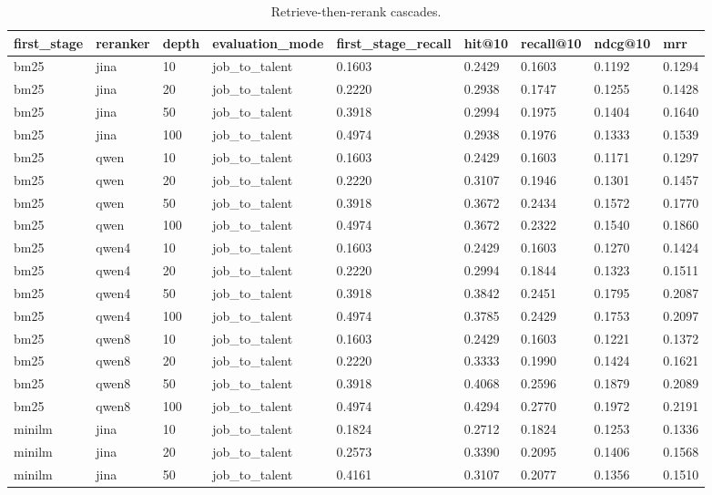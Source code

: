 \begin{table}[t]
\centering
\caption{Retrieve-then-rerank cascades.}
\label{tab:cascade}
\begin{tabular}{lllllllll}
\toprule
first_stage & reranker & depth & evaluation_mode & first_stage_recall & hit@10 & recall@10 & ndcg@10 & mrr \\
\midrule
bm25 & jina & 10 & job_to_talent & 0.1603 & 0.2429 & 0.1603 & 0.1192 & 0.1294 \\
bm25 & jina & 20 & job_to_talent & 0.2220 & 0.2938 & 0.1747 & 0.1255 & 0.1428 \\
bm25 & jina & 50 & job_to_talent & 0.3918 & 0.2994 & 0.1975 & 0.1404 & 0.1640 \\
bm25 & jina & 100 & job_to_talent & 0.4974 & 0.2938 & 0.1976 & 0.1333 & 0.1539 \\
bm25 & qwen & 10 & job_to_talent & 0.1603 & 0.2429 & 0.1603 & 0.1171 & 0.1297 \\
bm25 & qwen & 20 & job_to_talent & 0.2220 & 0.3107 & 0.1946 & 0.1301 & 0.1457 \\
bm25 & qwen & 50 & job_to_talent & 0.3918 & 0.3672 & 0.2434 & 0.1572 & 0.1770 \\
bm25 & qwen & 100 & job_to_talent & 0.4974 & 0.3672 & 0.2322 & 0.1540 & 0.1860 \\
bm25 & qwen4 & 10 & job_to_talent & 0.1603 & 0.2429 & 0.1603 & 0.1270 & 0.1424 \\
bm25 & qwen4 & 20 & job_to_talent & 0.2220 & 0.2994 & 0.1844 & 0.1323 & 0.1511 \\
bm25 & qwen4 & 50 & job_to_talent & 0.3918 & 0.3842 & 0.2451 & 0.1795 & 0.2087 \\
bm25 & qwen4 & 100 & job_to_talent & 0.4974 & 0.3785 & 0.2429 & 0.1753 & 0.2097 \\
bm25 & qwen8 & 10 & job_to_talent & 0.1603 & 0.2429 & 0.1603 & 0.1221 & 0.1372 \\
bm25 & qwen8 & 20 & job_to_talent & 0.2220 & 0.3333 & 0.1990 & 0.1424 & 0.1621 \\
bm25 & qwen8 & 50 & job_to_talent & 0.3918 & 0.4068 & 0.2596 & 0.1879 & 0.2089 \\
bm25 & qwen8 & 100 & job_to_talent & 0.4974 & 0.4294 & 0.2770 & 0.1972 & 0.2191 \\
minilm & jina & 10 & job_to_talent & 0.1824 & 0.2712 & 0.1824 & 0.1253 & 0.1336 \\
minilm & jina & 20 & job_to_talent & 0.2573 & 0.3390 & 0.2095 & 0.1406 & 0.1568 \\
minilm & jina & 50 & job_to_talent & 0.4161 & 0.3107 & 0.2077 & 0.1356 & 0.1510 \\

\end{tabular}
\end{table}
